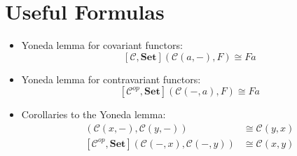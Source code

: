 \documentclass[DaoFP]{subfiles}
\begin{document}
\section{Useful Formulas}
\begin{itemize}
\item Yoneda lemma for covariant functors:
\[ [\mathcal{C}, \mathbf{Set}]( \mathcal{C}(a, -), F) \cong F a \]
\item Yoneda lemma for contravariant functors:
\[ [\mathcal{C}^{op}, \mathbf{Set}]( \mathcal{C}(-, a), F) \cong F a \]
\item Corollaries to the Yoneda lemma:
\begin{align*}
 [\mathcal{C}, \mathbf{Set}]( \mathcal{C}(x, -), \mathcal{C}(y, -)) &\cong \mathcal{C}(y, x) \\
 [\mathcal{C}^{op}, \mathbf{Set}]( \mathcal{C}(-, x), \mathcal{C}(-, y)) &\cong \mathcal{C}(x, y)
\end{align*}

\end{itemize}
\end{document}
